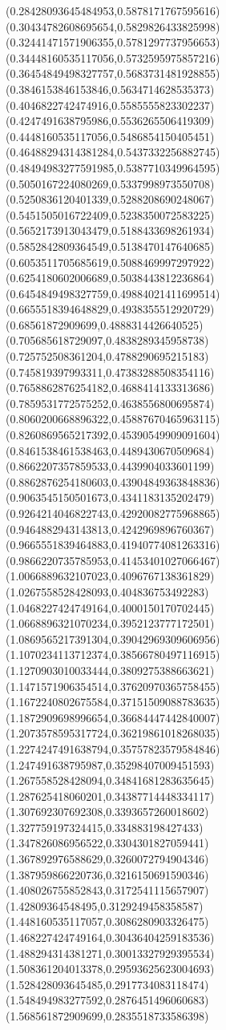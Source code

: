 {(0.28428093645484953,0.5878171767595616)
(0.30434782608695654,0.5829826433825998)
(0.32441471571906355,0.5781297737956653)
(0.34448160535117056,0.5732595975857216)
(0.36454849498327757,0.5683731481928855)
(0.3846153846153846,0.5634714628535373)
(0.4046822742474916,0.5585555823302237)
(0.4247491638795986,0.5536265506419309)
(0.4448160535117056,0.5486854150405451)
(0.46488294314381284,0.5437332256882745)
(0.48494983277591985,0.5387710349964595)
(0.5050167224080269,0.5337998973550708)
(0.5250836120401339,0.5288208690248067)
(0.5451505016722409,0.5238350072583225)
(0.5652173913043479,0.5188433698261934)
(0.5852842809364549,0.5138470147640685)
(0.6053511705685619,0.5088469997297922)
(0.6254180602006689,0.5038443812236864)
(0.6454849498327759,0.49884021411699514)
(0.6655518394648829,0.4938355512920729)
(0.68561872909699,0.4888314426640525)
(0.705685618729097,0.4838289345958738)
(0.725752508361204,0.4788290695215183)
(0.745819397993311,0.47383288508354116)
(0.7658862876254182,0.4688414133313686)
(0.7859531772575252,0.4638556800695874)
(0.8060200668896322,0.45887670465963115)
(0.8260869565217392,0.45390549909091604)
(0.8461538461538463,0.4489430670509684)
(0.8662207357859533,0.4439904033601199)
(0.8862876254180603,0.43904849363848836)
(0.9063545150501673,0.4341183135202479)
(0.9264214046822743,0.42920082775968865)
(0.9464882943143813,0.4242969896760367)
(0.9665551839464883,0.41940774081263316)
(0.9866220735785953,0.41453401027066467)
(1.0066889632107023,0.4096767138361829)
(1.0267558528428093,0.404836753492283)
(1.0468227424749164,0.4000150170702445)
(1.0668896321070234,0.3952123777172501)
(1.0869565217391304,0.39042969309606956)
(1.1070234113712374,0.38566780497116915)
(1.1270903010033444,0.3809275388663621)
(1.1471571906354514,0.37620970365758455)
(1.1672240802675584,0.37151509088783635)
(1.1872909698996654,0.36684447442840007)
(1.2073578595317724,0.36219861018268035)
(1.2274247491638794,0.35757823579584846)
(1.247491638795987,0.35298407009451593)
(1.267558528428094,0.34841681283635645)
(1.287625418060201,0.34387714448334117)
(1.307692307692308,0.3393657260018602)
(1.327759197324415,0.334883198427433)
(1.347826086956522,0.3304301827059441)
(1.367892976588629,0.3260072794904346)
(1.387959866220736,0.3216150691590346)
(1.408026755852843,0.3172541115657907)
(1.42809364548495,0.3129249458358587)
(1.448160535117057,0.3086280903326475)
(1.468227424749164,0.30436404259183536)
(1.488294314381271,0.30013327929395534)
(1.508361204013378,0.29593625623004693)
(1.528428093645485,0.2917734083118474)
(1.548494983277592,0.2876451496060683)
(1.568561872909699,0.2835518733586398)
}
